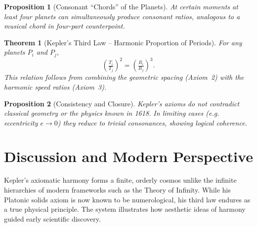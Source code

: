 \documentclass[11pt]{article}
\newtheorem{theorem}{Theorem}
\newtheorem{proposition}{Proposition}
\begin{document}
\begin{proposition}[Consonant ``Chords'' of the Planets]
At certain moments at least four planets can simultaneously produce consonant ratios, analogous to a musical chord in four-part counterpoint.
\end{proposition}

\begin{theorem}[Kepler's Third Law -- Harmonic Proportion of Periods]
For any planets $P_i$ and $P_j$,
\[\left(\tfrac{T_i}{T_j}\right)^2 = \left(\tfrac{R_i}{R_j}\right)^3.\]
This relation follows from combining the geometric spacing (Axiom~2) with the harmonic speed ratios (Axiom~3).
\end{theorem}

\begin{proposition}[Consistency and Closure]
Kepler's axioms do not contradict classical geometry or the physics known in 1618.  In limiting cases (e.g. eccentricity $e\to0$) they reduce to trivial consonances, showing logical coherence.
\end{proposition}

\section*{Discussion and Modern Perspective}
Kepler's axiomatic harmony forms a finite, orderly cosmos unlike the infinite hierarchies of modern frameworks such as the Theory of Infinity.  While his Platonic solids axiom is now known to be numerological, his third law endures as a true physical principle.  The system illustrates how aesthetic ideas of harmony guided early scientific discovery.
\end{document}

